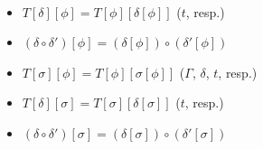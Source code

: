 \begin{lemma} $ $
  \begin{itemize}
  \item $T[\delta][\phi] = T[\phi][\delta[\phi]]$ ($t$, resp.)
  \item $(\delta \circ \delta') [\phi] = (\delta[\phi]) \circ (\delta'[\phi])$
  \item $T[\sigma][\phi] = T[\phi][\sigma[\phi]]$ ($\Gamma$, $\delta$, $t$, resp.)
  \item $T[\delta][\sigma] = T[\sigma][\delta[\sigma]]$ ($t$, resp.)
  \item $(\delta \circ \delta') [\sigma] = (\delta[\sigma]) \circ (\delta'[\sigma])$
  \end{itemize}
\end{lemma}
